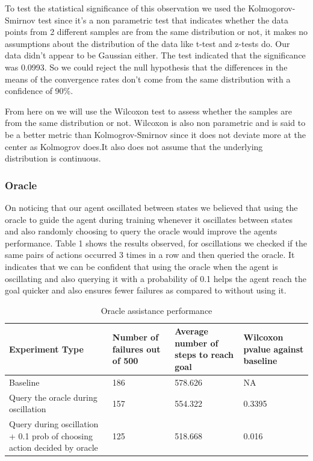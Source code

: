 \documentclass[letterpaper, 12 pt, conference]{ieeeconf}
\begin{document}
To test the statistical significance of this observation we used the Kolmogorov-Smirnov test since it’s a non parametric test that indicates whether the data points from 2 different samples are from the same distribution or not, it makes no assumptions about the distribution of the data like t-test and z-tests do. Our data didn't appear to be Gaussian either. The test indicated that the significance was 0.0993. So we could reject the null hypothesis that the differences in the means of the  convergence rates don’t come from the same distribution with a confidence of 90\%. 

From here on we will use the Wilcoxon test to assess whether the samples are from the same distribution or not. Wilcoxon is also non parametric and is said to be a better metric than Kolmogrov-Smirnov since it does not deviate more at the center as Kolmogrov does.It also does not assume that the underlying distribution is continuous.

\subsubsection{Oracle}

On noticing that our agent oscillated between states we believed that using the oracle to guide the agent during training whenever it oscillates between states and also randomly choosing to query the oracle would improve the agents performance. Table 1 shows the results observed, for oscillations we checked if the same pairs of actions occurred 3 times in a row and then queried the oracle. It indicates that we  can be confident that using the oracle when the agent is oscillating and also querying it with a probability of 0.1 helps the agent reach the goal quicker and also ensures fewer failures as compared to without using it.

\begin{table} [ht!]
    \caption{Oracle assistance performance}
    \begin{center}
        \begin{tabular}{|p{1.8cm}|p{1cm}|p{2cm}|p{2cm}|} 
            \hline
            Experiment Type & Number of failures out of 500 & Average number of steps to reach goal & Wilcoxon pvalue against baseline \\
            \hline
            Baseline & 186 & 578.626 & NA \\
            \hline
            Query the oracle during oscillation & 157 & 554.322 & 0.3395\\
            \hline
            Query during oscillation + 0.1 prob of choosing action decided by oracle & 125 &  518.668 &  0.016 \\
             \hline
        \end{tabular}
    \end{center}
\end{table}
\end{document}
